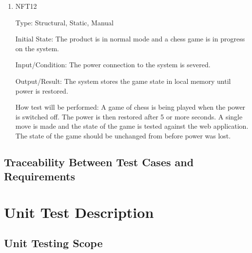 \documentclass[12pt, titlepage]{article}
\begin{document}
\begin{enumerate}
    \item{NFT12}

        Type: Structural, Static, Manual
                            
        Initial State: The product is in normal mode and a chess game is in progress on the system.
                            
        Input/Condition: The power connection to the system is severed.
                            
        Output/Result: The system stores the game state in local memory until power is restored.
                            
        How test will be performed: A game of chess is being played when the power is switched off. The power is then restored after 5 or more seconds. A single
            move is made and the state of the game is tested against the web application. The state of the game should be unchanged from before power was lost.
\end{enumerate}

\subsection{Traceability Between Test Cases and Requirements}


\section{Unit Test Description} \label{UnitTests}


\subsection{Unit Testing Scope}

\end{document}
